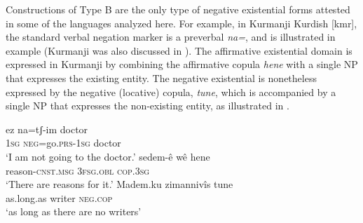 \documentclass[output=paper]{langsci/langscibook}
\begin{document}
Constructions of Type B are the only type of negative existential forms
attested in some of the languages analyzed here. For example, in
Kurmanji Kurdish [kmr], the standard verbal negation marker is
a preverbal \textit{na=}, and is illustrated in example
 (Kurmanji was also discussed in
). The affirmative existential domain is expressed in
Kurmanji by combining the affirmative copula \textit{hene} with a single NP
that expresses the existing entity. The negative existential is nonetheless
expressed by the negative (locative) copula, \textit{tune}, which is
accompanied by a single NP that expresses the non-existing entity, as
illustrated in .
%
\begin{exe}\ex
{}
\begin{xlist}
\ex\label{ex:ieur-kurmanji-doctor}
    \gll ez na=tʃ-im doctor \\
\textsc{1sg}   \textsc{neg}=go.\textsc{prs-1sg}    doctor \\
    \glt `I am not going to the doctor.'
\ex
\gll sedem-ê wê hene\\
reason-\textsc{cnst}.\textsc{msg}   \textsc{3fsg}.\textsc{obl}
\textsc{cop}.\textsc{3sg}\\
\glt `There are reasons for it.'
\ex\label{ex:ieur-kurmanji-nowriters}
\gll Madem.ku zimannivîs tune \\
as.long.as  writer \textsc{neg.cop}\\
\glt `as long as there are no writers'
\end{xlist}\end{exe}
\end{document}
